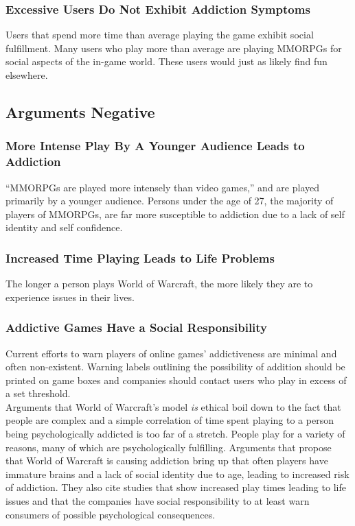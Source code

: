 \documentclass[11pt]{article}
\begin{document}
\begin{multicols}{2}
\subsubsection{Excessive Users Do Not Exhibit Addiction Symptoms}
Users that spend more time than average playing the game exhibit social fulfillment. Many users who play more than average are playing MMORPGs for social aspects of the in-game world. These users would just as likely find fun elsewhere. \cite{ExcessiveUseForSocialAspects}
\subsection{Arguments Negative}
\subsubsection{More Intense Play By A Younger Audience Leads to Addiction}
``MMORPGs are played more intensely than video games,'' and are played primarily by a younger audience. Persons under the age of 27, the majority of players of MMORPGs, are far more susceptible to addiction due to a lack of self identity and self confidence. \cite{YoungerAudiencesGetAddicted}
\subsubsection{Increased Time Playing Leads to Life Problems}
The longer a person plays World of Warcraft, the more likely they are to experience issues in their lives. \cite{ProblemUsageAmongHighlyEngagedPlayers}
\subsubsection{Addictive Games Have a Social Responsibility}
Current efforts to warn players of online games' addictiveness are minimal and often non-existent. Warning labels outlining the possibility of addition should be printed on game boxes and companies should contact users who play in excess of a set threshold. \cite{MMORPGSocialResponsibility}\\

Arguments that World of Warcraft's model \emph{is} ethical boil down to the fact that people are complex and a simple correlation of time spent playing to a person being psychologically addicted is too far of a stretch. People play for a variety of reasons, many of which are psychologically fulfilling. Arguments that propose that World of Warcraft is causing addiction bring up that often players have immature brains and a lack of social identity due to age, leading to increased risk of addiction. They also cite studies that show increased play times leading to life issues and that the companies have social responsibility to at least warn consumers of possible psychological consequences.


\end{multicols}
\end{document}
